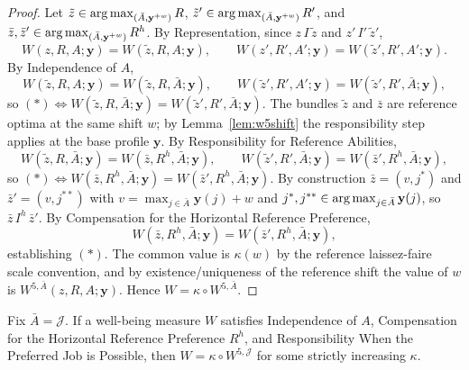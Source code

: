 \begin{proof}
Let $\tilde z\in\operatorname*{arg\,max}_{(\bar A,\mathbf y^{+w})}R$,
$\tilde z'\in\operatorname*{arg\,max}_{(\bar A,\mathbf y^{+w})}R'$, and
$\bar z,\bar z'\in\operatorname*{arg\,max}_{(\bar A,\mathbf y^{+w})}R^h$. By Representation, since
$z\,I\,\tilde z$ and $z'\,I'\,\tilde z'$,
\begin{equation*}
W(z,R,A;\mathbf y)=W(\tilde z,R,A;\mathbf y),\qquad
W(z',R',A';\mathbf y)=W(\tilde z',R',A';\mathbf y).
\end{equation*}
By Independence of $A$,
\begin{equation*}
W(\tilde z,R,A;\mathbf y)=W(\tilde z,R,\bar A;\mathbf y),\qquad
W(\tilde z',R',A';\mathbf y)=W(\tilde z',R',\bar A;\mathbf y),
\end{equation*}
so $(*)\Leftrightarrow W(\tilde z,R,\bar A;\mathbf y)=W(\tilde z',R',\bar
A;\mathbf y)$. The bundles $\tilde z$ and $\bar z$ are reference optima at the
same shift $w$; by Lemma~\ref{lem:w5shift} the responsibility step applies at
the base profile $\mathbf y$. By Responsibility for Reference Abilities,
\begin{equation*}
W(\tilde z,R,\bar A;\mathbf y)=W(\bar z,R^h,\bar A;\mathbf y),\qquad
W(\tilde z',R',\bar A;\mathbf y)=W(\bar z',R^h,\bar A;\mathbf y),
\end{equation*}
so $(*)\Leftrightarrow W(\bar z,R^h,\bar A;\mathbf y)=W(\bar z',R^h,\bar
A;\mathbf y)$. By construction $\bar z=(v,j^*)$ and $\bar z'=(v,j^{**})$ with
$v=\max_{j\in\bar A}\mathbf y(j)+w$ and
$j^*,j^{**}\in\operatorname*{arg\,max}_{j\in\bar A}\mathbf y(j)$, so $\bar z\,I^h\,\bar z'$. By
Compensation for the Horizontal Reference Preference,
\begin{equation*}
W(\bar z,R^h,\bar A;\mathbf y)=W(\bar z',R^h,\bar A;\mathbf y),
\end{equation*}
establishing $(*)$. The common value is $\kappa(w)$ by the reference
laissez-faire scale convention, and by existence/uniqueness of the reference
shift the value of $w$ is $W^{5,\bar A}(z,R,A;\mathbf y)$. Hence
$W=\kappa\circ W^{5,\bar A}$.
\end{proof}

\begin{theorem}[$W^5$, special case $\bar A=\mathcal J$]
\label{thm:w5special}
Fix $\bar A=\mathcal J$. If a well-being measure $W$ satisfies Independence of
$A$, Compensation for the Horizontal Reference Preference $R^h$, and
Responsibility When the Preferred Job is Possible, then
$W=\kappa\circ W^{5,\mathcal J}$ for some strictly increasing $\kappa$.
\end{theorem}

